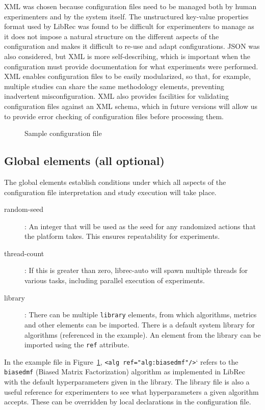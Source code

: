 XML was chosen because configuration files need to be managed both by human experimenters and by the system itself. The unstructured key-value properties format used by LibRec was found to be difficult for experimenters to manage as it does not impose a natural structure on the different aspects of the configuration and makes it difficult to re-use and adapt configurations. JSON was also considered, but XML is more self-describing, which is important when the configuration must provide documentation for what experiments were performed. XML enables configuration files to be easily modularized, so that, for example, multiple studies can share the same methodology elements, preventing inadvertent misconfiguration. XML also provides facilities for validating configuration files against an XML schema, which in future versions will allow us to provide error checking of configuration files before processing them.

\begin{figure}[ht!]
    \centering
    
    \caption{Sample configuration file}
    \label{fig:config}
    \vspace{-0.15in}
\end{figure}

\subsection{Global elements (all optional)}
The global elements establish conditions under which all aspects of the configuration file interpretation and study execution will take place.

\begin{description}
\item[random-seed]: An integer that will be used as the seed for any randomized actions that the platform takes. This ensures repeatability for experiments.
\item[thread-count]: If this is greater than zero, librec-auto will spawn multiple threads for various tasks, including parallel execution of experiments.
\item[library]: There can be multiple \texttt{library} elements, from which algorithms, metrics and other elements can be imported. There is a default system library for algorithms (referenced in the example). An element from the library can be imported using the \texttt{ref} attribute.
\end{description}

In the example file in Figure~\ref{fig:config}, \texttt{<alg ref="alg:biasedmf"/>}` refers to the \texttt{biasedmf} (Biased Matrix Factorization) algorithm as implemented in LibRec with the default hyperparameters given in the library. The library file is also a useful reference for experimenters to see what hyperparameters a given algorithm accepts. These can be overridden by local declarations in the configuration file.

